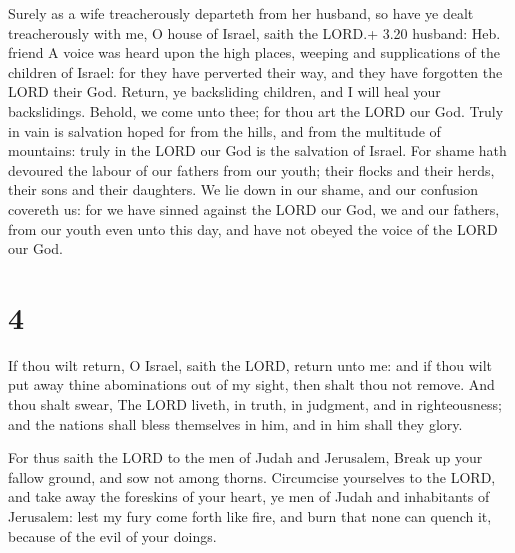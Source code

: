  Surely as a wife treacherously departeth from her
husband, so have ye dealt treacherously with me, O house of Israel,
saith the LORD.+ 3.20 husband: Heb. friend  A voice was
heard upon the high places, weeping and supplications of the children of
Israel: for they have perverted their way, and they have forgotten the
LORD their God.  Return, ye backsliding children, and I
will heal your backslidings. Behold, we come unto thee; for thou art the
LORD our God.  Truly in vain is salvation hoped for from
the hills, and from the multitude of mountains: truly in the LORD our
God is the salvation of Israel.  For shame hath devoured
the labour of our fathers from our youth; their flocks and their herds,
their sons and their daughters.  We lie down in our shame,
and our confusion covereth us: for we have sinned against the LORD our
God, we and our fathers, from our youth even unto this day, and have not
obeyed the voice of the LORD our God.

\hypertarget{section-3}{%
\section{4}\label{section-3}}

 If thou wilt return, O Israel, saith the LORD, return unto
me: and if thou wilt put away thine abominations out of my sight, then
shalt thou not remove.  And thou shalt swear, The LORD
liveth, in truth, in judgment, and in righteousness; and the nations
shall bless themselves in him, and in him shall they glory.

 For thus saith the LORD to the men of Judah and
Jerusalem, Break up your fallow ground, and sow not among thorns.
 Circumcise yourselves to the LORD, and take away the
foreskins of your heart, ye men of Judah and inhabitants of Jerusalem:
lest my fury come forth like fire, and burn that none can quench it,
because of the evil of your doings.

